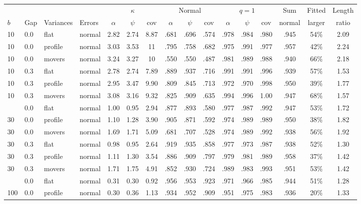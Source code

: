 \begin{tabular}{@{}l l l l ccc ccc ccc c c c@{}}
\toprule
 & & & & \multicolumn{3}{c}{$\kappa$} & \multicolumn{3}{c}{Normal} & \multicolumn{3}{c}{$q=1$} & Sum & Fitted & Length \\ \cmidrule(lr){5-7}\cmidrule(lr){8-10}\cmidrule(lr){11-13}
$b$ & Gap & Variances & Errors & $\alpha$ & $\psi$ & cov & $\alpha$ & $\psi$ & cov & $\alpha$ & $\psi$ & cov & normal & larger & ratio \\
\midrule
10 & 0.0 & flat & normal & 2.82 & 2.74 & 8.87 & .681 & .696 & .574 & .978 & .984 & .980 & .945 & 54\% & 2.09 \\
10 & 0.0 & profile & normal & 3.03 & 3.53 & 11 & .795 & .758 & .682 & .975 & .991 & .977 & .957 & 42\% & 2.24 \\
10 & 0.0 & movers & normal & 3.24 & 3.27 & 10 & .550 & .550 & .487 & .981 & .989 & .988 & .940 & 66\% & 2.18 \\
10 & 0.3 & flat & normal & 2.78 & 2.74 & 7.89 & .889 & .937 & .716 & .991 & .991 & .996 & .939 & 57\% & 1.53 \\
10 & 0.3 & profile & normal & 2.95 & 3.47 & 9.90 & .809 & .845 & .713 & .972 & .970 & .998 & .950 & 39\% & 1.77 \\
10 & 0.3 & movers & normal & 3.08 & 3.16 & 9.32 & .825 & .909 & .635 & .994 & .996 & 1.00 & .947 & 68\% & 1.57 \\
\addlinespace
30 & 0.0 & flat & normal & 1.00 & 0.95 & 2.94 & .877 & .893 & .580 & .977 & .987 & .992 & .947 & 53\% & 1.72 \\
30 & 0.0 & profile & normal & 1.10 & 1.28 & 3.90 & .905 & .871 & .592 & .974 & .989 & .989 & .950 & 38\% & 1.82 \\
30 & 0.0 & movers & normal & 1.69 & 1.71 & 5.09 & .681 & .707 & .528 & .974 & .989 & .992 & .938 & 56\% & 1.92 \\
30 & 0.3 & flat & normal & 0.98 & 0.95 & 2.64 & .919 & .935 & .858 & .977 & .973 & .987 & .938 & 52\% & 1.30 \\
30 & 0.3 & profile & normal & 1.11 & 1.30 & 3.54 & .886 & .909 & .797 & .979 & .981 & .989 & .958 & 37\% & 1.42 \\
30 & 0.3 & movers & normal & 1.71 & 1.75 & 4.91 & .852 & .930 & .724 & .989 & .983 & .993 & .951 & 53\% & 1.42 \\
\addlinespace
100 & 0.0 & flat & normal & 0.31 & 0.30 & 0.92 & .956 & .953 & .923 & .971 & .966 & .985 & .944 & 51\% & 1.28 \\
100 & 0.0 & profile & normal & 0.30 & 0.36 & 1.13 & .934 & .952 & .909 & .951 & .975 & .983 & .936 & 20\% & 1.33 \\

\end{tabular}
